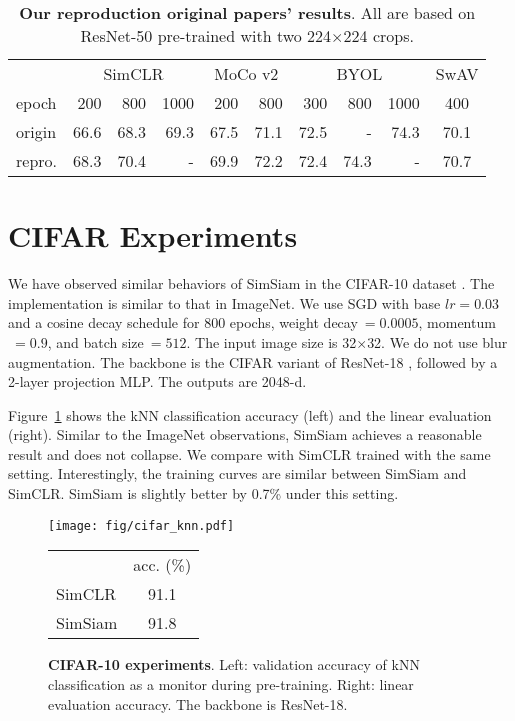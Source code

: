 \documentclass[final]{cvpr}
\newcommand{\tablestyle}[2]{\setlength{\tabcolsep}{#1}\renewcommand{\arraystretch}{#2}\centering\footnotesize}
\begin{document}
\begin{table}[t]
\centering
\small
\tablestyle{4pt}{1.1}
\begin{tabular}{l | rrr | rr | rrr | c }
& \multicolumn{3}{c|}{SimCLR}
& \multicolumn{2}{c|}{MoCo v2}
& \multicolumn{3}{c|}{BYOL}
& \multicolumn{1}{c}{SwAV}
\\
epoch
& 200 & 800 & 1000  & 200 & 800  & 300 & 800 & 1000  & 400  \\
\shline
origin
& 66.6 & 68.3 & 69.3  & 67.5 & 71.1  & 72.5 & - & 74.3  & 70.1   \\
repro.
& 68.3 & 70.4 & -  & 69.9 & 72.2  & 72.4 & 74.3 & -  & 70.7   \end{tabular}
\vspace{.3em}
\caption{
\textbf{Our reproduction \vs original papers' results}. All are based on ResNet-50 pre-trained with two 224$\times$224 crops.
\label{tab:repro}
\vspace{-.5em}
}
\end{table}


\section{CIFAR Experiments}

We have observed similar behaviors of SimSiam in the CIFAR-10 dataset \cite{Krizhevsky2009}.
The implementation is similar to that in ImageNet.
We use SGD with base $lr\!=\!0.03$ and a cosine decay schedule for 800 epochs, weight decay$~\!=\!0.0005$, momentum$~\!=\!0.9$, and batch size$~\!=\!512$. The input image size is 32$\times$32. We do not use blur augmentation. The backbone is the CIFAR variant of ResNet-18 \cite{He2016}, followed by a 2-layer projection MLP. The outputs are 2048-d.

Figure~\ref{fig:cifar} shows the kNN classification accuracy (left) and the linear evaluation (right). 
Similar to the ImageNet observations, SimSiam achieves a reasonable result and does not collapse.
We compare with SimCLR \cite{Chen2020} trained with the same setting. Interestingly, the training curves are similar between SimSiam and SimCLR. SimSiam is slightly better by 0.7\% under this setting.

\begin{figure}[h]
\begin{minipage}[c]{0.64\linewidth}
\texttt{[image: fig/cifar\_knn.pdf]}
\end{minipage}
\begin{minipage}[c]{0.19\linewidth}
\small
\tablestyle{4pt}{1.2}
\begin{tabular}{l|c}
 & acc. (\%) \\
\shline
SimCLR & 91.1 \\
SimSiam & 91.8 \\
\end{tabular}
\vspace{-.5em}
\end{minipage}
\vspace{.8em}
\caption{
\textbf{CIFAR-10 experiments}. Left: validation accuracy of kNN classification as a monitor during pre-training. Right: linear evaluation accuracy.
The backbone is ResNet-18.
\label{fig:cifar}
\vspace{-.5em}
}
\end{figure}
\end{document}
